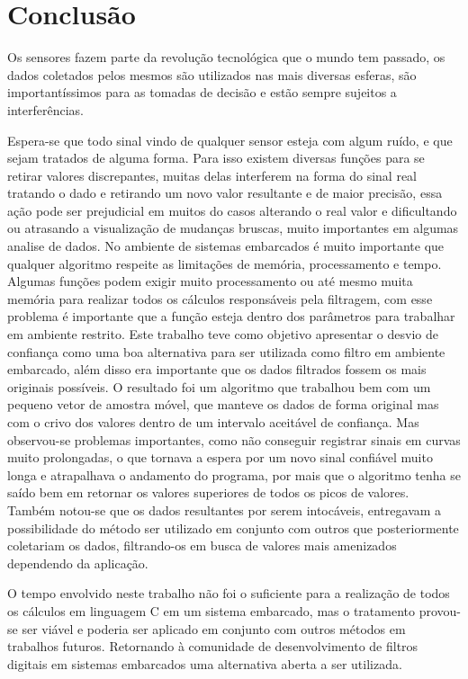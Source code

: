 
\chapter{Conclusão}\label{cap:conclusao}

Os sensores fazem parte da revolução tecnológica que o mundo tem passado, os dados coletados pelos mesmos são utilizados nas mais diversas esferas, são importantíssimos para as tomadas de decisão e estão sempre sujeitos a interferências.
 
Espera-se que todo sinal vindo de qualquer sensor esteja com algum ruído, e que sejam tratados de alguma forma. Para isso existem diversas funções para se retirar valores discrepantes, muitas delas interferem na forma do sinal real tratando o dado e retirando um novo valor resultante e de maior precisão, essa ação pode ser prejudicial em muitos do casos alterando o real valor e dificultando ou atrasando a visualização de mudanças bruscas, muito importantes em algumas analise de dados. No ambiente de sistemas embarcados é muito importante que qualquer algoritmo respeite as limitações de memória, processamento e tempo. Algumas funções podem exigir muito processamento ou até mesmo muita memória para realizar todos os cálculos responsáveis pela filtragem, com esse problema é importante que a função esteja dentro dos parâmetros para trabalhar em ambiente restrito.
Este trabalho teve como objetivo apresentar o desvio de confiança como uma boa alternativa para ser utilizada como filtro em ambiente embarcado, além disso era importante que os dados filtrados fossem os mais originais possíveis. O resultado foi um algoritmo que trabalhou bem com um pequeno vetor de amostra móvel, que manteve os dados de forma original mas com o crivo dos valores dentro de um intervalo aceitável de confiança. Mas observou-se problemas importantes, como não conseguir registrar sinais em curvas muito prolongadas, o que tornava a espera por um novo sinal confiável muito longa e atrapalhava o andamento do programa, por mais que o algoritmo tenha se saído bem em retornar os valores superiores de todos os picos de valores. Também notou-se que os dados resultantes por serem intocáveis, entregavam a possibilidade do método ser utilizado em conjunto com outros que posteriormente coletariam os dados, filtrando-os em busca de valores mais amenizados dependendo da aplicação.
 
O tempo envolvido neste trabalho não foi o suficiente para a realização de todos os cálculos em linguagem C em um sistema embarcado, mas o tratamento provou-se ser viável e poderia ser aplicado em conjunto com outros métodos em trabalhos futuros. Retornando à comunidade de desenvolvimento de filtros digitais em sistemas embarcados uma alternativa aberta a ser utilizada.





